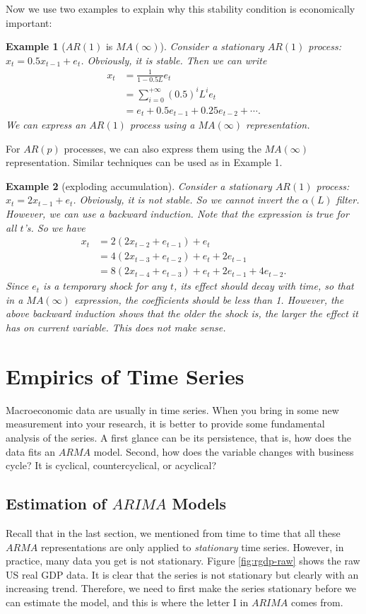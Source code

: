 \documentclass[12pt]{article}
\newtheorem{example}{Example}
\begin{document}
Now we use two examples to explain why this stability condition is economically important:
\begin{example}[$AR(1)$ is $MA(\infty)$]
    Consider a stationary $AR(1)$ process: $x_t = 0.5 x_{t-1} + e_t$. Obviously, it is stable. Then we can write
    \begin{align*}
        x_t &= \frac{1}{1-0.5L} e_t \\
        &= \sum_{i=0}^{+\infty} (0.5)^i L^i e_t\\
        &= e_t + 0.5 e_{t-1} + 0.25 e_{t-2} + \cdots.
    \end{align*}
    We can express an $AR(1)$ process using a $MA(\infty)$ representation.
\end{example}
For $AR(p)$ processes, we can also express them using the $MA(\infty)$ representation. Similar techniques can be used as in Example 1.
\begin{example}[exploding accumulation]
    Consider a stationary $AR(1)$ process: $x_t = 2 x_{t-1} + e_t$. Obviously, it is not stable. So we cannot invert the $\alpha(L)$ filter. However, we can use a backward induction. Note that the expression is true for all $t$'s. So we have
    \begin{align*}
        x_t &= 2(2x_{t-2} + e_{t-1}) + e_t\\
        &= 4(2x_{t-3} + e_{t-2}) + e_t + 2 e_{t-1}\\
        &= 8(2x_{t-4} + e_{t-3}) + e_t + 2 e_{t-1} + 4 e_{t-2}.
    \end{align*}
    Since $e_t$ is a temporary shock for any $t$, its effect should decay with time, so that in a $MA(\infty)$ expression, the coefficients should be less than 1. However, the above backward induction shows that the older the shock is, the larger the effect it has on current variable. This does not make sense.
\end{example}

\section{Empirics of Time Series}
Macroeconomic data are usually in time series. When you bring in some new measurement into your research, it is better to provide some fundamental analysis of the series. A first glance can be its persistence, that is, how does the data fits an $ARMA$ model. Second, how does the variable changes with business cycle? It is cyclical, countercyclical, or acyclical?

\subsection{Estimation of \texorpdfstring{$ARIMA$}{ARIMA} Models}
Recall that in the last section, we mentioned from time to time that all these $ARMA$ representations are only applied to \textit{stationary} time series. However, in practice, many data you get is not stationary. Figure \ref{fig:rgdp-raw} shows the raw US real GDP data. It is clear that the series is not stationary but clearly with an increasing trend. Therefore, we need to first make the series stationary before we can estimate the model, and this is where the letter I in $ARIMA$ comes from. 
\end{document}
